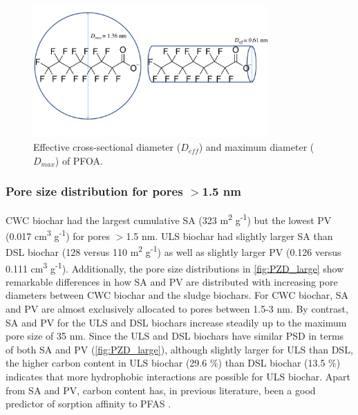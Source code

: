 \begin{figure}
    \centering
    \includegraphics[width=0.8\textwidth, trim={0 2cm 0 0},clip]{Diagrams/Molecular_size.pdf}
    \caption{Effective cross-sectional diameter ($D_{eff}$) and maximum diameter ($D_{max}$) of PFOA.}
    \label{fig:molecularSize}
\end{figure}

\subsubsection{Pore size distribution for pores $>$1.5 nm}
CWC biochar had the largest cumulative SA (323 m\textsuperscript{2} g\textsuperscript{-1}) but the lowest PV (0.017 cm\textsuperscript{3} g\textsuperscript{-1}) for pores $>$1.5 nm. ULS biochar had slightly larger SA than DSL biochar (128 versus 110 m\textsuperscript{2} g\textsuperscript{-1}) as well as slightly larger PV (0.126 versus 0.111 cm\textsuperscript{3} g\textsuperscript{-1}). Additionally, the pore size distributions in \cref{fig:PZD_large} show remarkable differences in how SA and PV are distributed with increasing pore diameters between CWC biochar and the sludge biochars. For CWC biochar, SA and PV are almost exclusively allocated to pores between 1.5-3 nm. By contrast, SA and PV for the ULS and DSL biochars increase steadily up to the maximum pore size of 35 nm. Since the ULS and DSL biochars have similar PSD in terms of both SA and PV (\cref{fig:PZD_large}), although slightly larger for ULS than DSL, the higher carbon content in ULS biochar (29.6 \%) than DSL biochar (13.5 \%) indicates that more hydrophobic interactions are possible for ULS biochar. Apart from SA and PV, carbon content has, in previous literature, been a good predictor of sorption affinity to PFAS \citep{Hale2016,Cornelissen2005}.  

